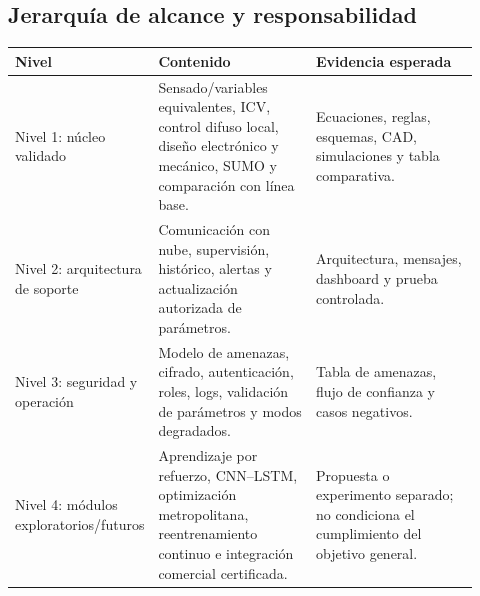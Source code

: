 \documentclass[12pt,a4paper,oneside]{report}
\begin{document}
\subsection{Jerarquía de alcance y responsabilidad}\label{jerarquia-alcance-v2}

\begin{center}
\label{fig:edge-nube-controlador-v2}
\end{center}

\begin{longtable}{@{}p{0.17\linewidth}p{0.36\linewidth}p{0.39\linewidth}@{}}
\toprule
\textbf{Nivel} & \textbf{Contenido} & \textbf{Evidencia esperada}\\
\midrule
\endhead
Nivel 1: núcleo validado & Sensado/variables equivalentes, ICV, control difuso local, diseño electrónico y mecánico, SUMO y comparación con línea base. & Ecuaciones, reglas, esquemas, CAD, simulaciones y tabla comparativa.\\
Nivel 2: arquitectura de soporte & Comunicación con nube, supervisión, histórico, alertas y actualización autorizada de parámetros. & Arquitectura, mensajes, dashboard y prueba controlada.\\
Nivel 3: seguridad y operación & Modelo de amenazas, cifrado, autenticación, roles, logs, validación de parámetros y modos degradados. & Tabla de amenazas, flujo de confianza y casos negativos.\\
Nivel 4: módulos exploratorios/futuros & Aprendizaje por refuerzo, CNN--LSTM, optimización metropolitana, reentrenamiento continuo e integración comercial certificada. & Propuesta o experimento separado; no condiciona el cumplimiento del objetivo general.\\
\bottomrule
\end{longtable}
\end{document}
